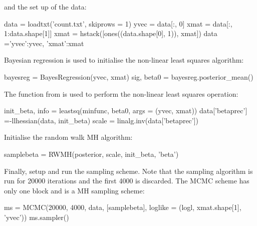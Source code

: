 \documentclass[article]{jss}
\begin{document}
and the set up of the data:
\begin{Code}
data = loadtxt('count.txt', skiprows = 1)
yvec = data[:, 0]
xmat = data[:, 1:data.shape[1]]
xmat = hstack([ones((data.shape[0], 1)), xmat])
data ={'yvec':yvec, 'xmat':xmat} 
\end{Code}

Bayesian regression is used to initialise the non-linear least squares
algorithm:
\begin{Code}
bayesreg = BayesRegression(yvec, xmat)
sig, beta0 = bayesreg.posterior_mean()
\end{Code}

The function  from  is used to perform the
non-linear least squares operation:

\begin{Code}
init_beta, info = leastsq(minfunc, beta0, args = (yvec, xmat))
data['betaprec'] =-llhessian(data, init_beta)
scale = linalg.inv(data['betaprec'])
\end{Code}

Initialise the random walk MH algorithm:
\begin{Code}
samplebeta = RWMH(posterior, scale, init_beta, 'beta')
\end{Code}

Finally, setup and run the sampling scheme.  Note that the sampling
algorithm is run for 20000 iterations and the first 4000 is
discarded. The MCMC scheme has only one block and is a MH sampling
scheme:

\begin{Code}
ms = MCMC(20000, 4000, data, [samplebeta], loglike = (logl, xmat.shape[1], 'yvec'))
ms.sampler()
\end{Code}






\end{document}
